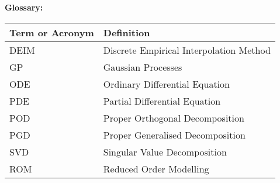 \begin{table}[h]
\textbf{\textsf{Glossary:}}
\begin{center}
\begin{tabular}{|p{4.0cm}|p{12.0cm}|}
\hline
\textbf{\textsf{Term or Acronym}}
& \textbf{\textsf{Definition}} \\
\hline
 DEIM & Discrete Empirical Interpolation Method \\
 GP & Gaussian Processes \\
 ODE & Ordinary Differential Equation \\
 PDE & Partial Differential Equation \\
 POD & Proper Orthogonal Decomposition \\
 PGD & Proper Generalised Decomposition \\
 SVD & Singular Value Decomposition \\
 ROM & Reduced Order Modelling\\
\hline
\end{tabular}
\end{center}
\end{table}



